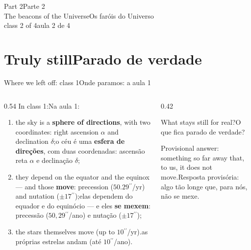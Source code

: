\documentclass[aspectratio=169,11pt]{beamer}
\newcommand{\tr}[2]{\ifEN#2\else#1\fi}
\newcommand{\bnum}[1]{\textbf{\textcolor{mTeal}{#1}}}
\newcommand{\asec}{\ensuremath{{}^{\prime\prime}}}
\begin{document}
\begin{frame}[standout]
  \tr{Parte 2}{Part 2}\\[6pt]
  {\normalsize \tr{Os faróis do Universo}{The beacons of the Universe}}\\[4pt]
  {\scriptsize \tr{aula 2 de 4}{class 2 of 4}}
\end{frame}

\section{\tr{Parado de verdade}{Truly still}}

\begin{frame}{\tr{Onde paramos: a aula 1}{Where we left off: class 1}}
  \begin{columns}[T]
    \begin{column}{0.54\textwidth}
      \tr{Na aula 1:}{In class 1:}
      \begin{enumerate}
        \setlength{\itemsep}{4pt}
        \item \tr{o céu é uma \bnum{esfera de direções}, com duas coordenadas: ascensão reta
              $\alpha$ e declinação $\delta$;}{the sky is a \bnum{sphere of directions}, with two
              coordinates: right ascension $\alpha$ and declination $\delta$;}
        \item \tr{elas dependem do equador e do equinócio --- e eles \bnum{se mexem}:
              precessão ($50{,}29\asec$/ano) e nutação ($\pm 17\asec$);}{they depend on the
              equator and the equinox --- and those \bnum{move}: precession
              ($50.29\asec$/yr) and nutation ($\pm 17\asec$);}
        \item \tr{as próprias estrelas andam (até $10\asec$/ano).}{the stars themselves move (up
              to $10\asec$/yr).}
      \end{enumerate}
    \end{column}
    \begin{column}{0.42\textwidth}
      \begin{cuidado}[title={\tr{A pergunta de hoje}{Today's question}}]
        \tr{O que fica parado \alert{de verdade}?}{What stays still \alert{for real}?}
        \medskip

        \tr{Resposta provisória: algo tão longe que, para nós, não se mexe.}{Provisional
        answer: something so far away that, to us, it does not move.}
      \end{cuidado}
    \end{column}
  \end{columns}
\end{frame}
\end{document}
